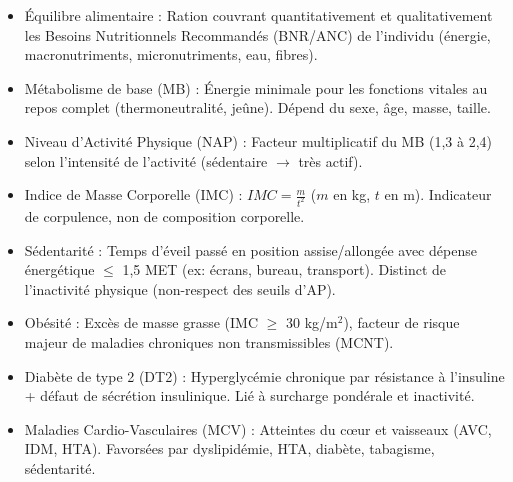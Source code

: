 \documentclass[11pt]{article}
\newcommand{\cle}[1]{{\popxbold\color{popdark}#1}}
\newcounter{popsec}
\newcounter{popsub}
\newcommand{\courssub}[1]{%
  \stepcounter{popsub}%
  \par\vspace{9pt}\noindent{\popxbold\fontsize{11.5}{13}\selectfont\color{popink}{\color{poporange}\thepopsec.\thepopsub}\hspace{6pt}#1}\par\nopagebreak\vspace{4pt}
}
\begin{document}
\begin{bilan}
\courssub{Définitions clés}
\begin{itemize}
    \item \cle{Équilibre alimentaire} : Ration couvrant quantitativement et qualitativement les \cle{Besoins Nutritionnels Recommandés (BNR/ANC)} de l'individu (énergie, macronutriments, micronutriments, eau, fibres).
    \item \cle{Métabolisme de base (MB)} : Énergie minimale pour les fonctions vitales au repos complet (thermoneutralité, jeûne). Dépend du sexe, âge, masse, taille.
    \item \cle{Niveau d'Activité Physique (NAP)} : Facteur multiplicatif du MB (1,3 à 2,4) selon l'intensité de l'activité (sédentaire $\rightarrow$ très actif).
    \item \cle{Indice de Masse Corporelle (IMC)} : $IMC = \frac{m}{t^2}$ ($m$ en kg, $t$ en m). Indicateur de corpulence, non de composition corporelle.
    \item \cle{Sédentarité} : Temps d'éveil passé en position assise/allongée avec dépense énergétique $\le$ 1,5 MET (ex: écrans, bureau, transport). Distinct de l'inactivité physique (non-respect des seuils d'AP).
    \item \cle{Obésité} : Excès de masse grasse (IMC $\ge$ 30 kg/m$^2$), facteur de risque majeur de maladies chroniques non transmissibles (MCNT).
    \item \cle{Diabète de type 2 (DT2)} : Hyperglycémie chronique par résistance à l'insuline + défaut de sécrétion insulinique. Lié à surcharge pondérale et inactivité.
    \item \cle{Maladies Cardio-Vasculaires (MCV)} : Atteintes du cœur et vaisseaux (AVC, IDM, HTA). Favorsées par dyslipidémie, HTA, diabète, tabagisme, sédentarité.
\end{itemize}


\end{bilan}
\end{document}
